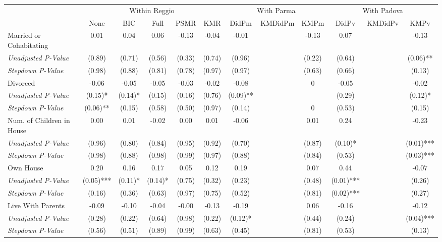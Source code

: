 \begin{tabular}{l c c c c c c c c c c c}
\toprule
& \multicolumn{5}{c}{Within Reggio} & \multicolumn{3}{c}{With Parma} & \multicolumn{3}{c}{With Padova} \\\cmidrule(lr){2-6} \cmidrule(lr){7-9} \cmidrule(lr){10-12}
 & None & BIC & Full & PSMR & KMR & DidPm & KMDidPm & KMPm & DidPv & KMDidPv & KMPv \\
\midrule
Married or Cohabitating & 0.01 & 0.04 & 0.06 & -0.13 & -0.04 & -0.01 & & -0.13 & 0.07 & & -0.13 \\
\quad \textit{Unadjusted P-Value} & (0.89) & (0.71) & (0.56) & (0.33) & (0.74) & (0.96) & & (0.22) & (0.64) & & (0.06)** \\
\quad \textit{Stepdown P-Value} & (0.98) & (0.88) & (0.81) & (0.78) & (0.97) & (0.97) & & (0.63) & (0.66) & & (0.13) \\
Divorced & -0.06 & -0.05 & -0.05 & -0.03 & -0.02 & -0.08 & & 0 & -0.05 & & -0.02 \\
\quad \textit{Unadjusted P-Value} & (0.15)* & (0.14)* & (0.15) & (0.16) & (0.76) & (0.09)** & & & (0.29) & & (0.12)* \\
\quad \textit{Stepdown P-Value} & (0.06)** & (0.15) & (0.58) & (0.50) & (0.97) & (0.14) & & 0 & (0.53) & & (0.15) \\
Num. of Children in House & 0.00 & 0.01 & -0.02 & 0.00 & 0.01 & -0.06 & & 0.01 & 0.24 & & -0.23 \\
\quad \textit{Unadjusted P-Value} & (0.96) & (0.80) & (0.84) & (0.95) & (0.92) & (0.70) & & (0.87) & (0.10)* & & (0.01)*** \\
\quad \textit{Stepdown P-Value} & (0.98) & (0.88) & (0.98) & (0.99) & (0.97) & (0.88) & & (0.84) & (0.53) & & (0.03)*** \\
Own House & 0.20 & 0.16 & 0.17 & 0.05 & 0.12 & 0.19 & & 0.07 & 0.44 & & -0.07 \\
\quad \textit{Unadjusted P-Value} & (0.05)*** & (0.11)* & (0.14)* & (0.75) & (0.32) & (0.23) & & (0.48) & (0.01)*** & & (0.26) \\
\quad \textit{Stepdown P-Value} & (0.16) & (0.36) & (0.63) & (0.97) & (0.75) & (0.52) & & (0.81) & (0.02)*** & & (0.27) \\
Live With Parents & -0.09 & -0.10 & -0.04 & -0.00 & -0.13 & -0.19 & & 0.06 & -0.16 & & -0.12 \\
\quad \textit{Unadjusted P-Value} & (0.28) & (0.22) & (0.64) & (0.98) & (0.22) & (0.12)* & & (0.44) & (0.24) & & (0.04)*** \\
\quad \textit{Stepdown P-Value} & (0.56) & (0.51) & (0.89) & (0.99) & (0.63) & (0.45) & & (0.81) & (0.53) & & (0.13) \\
\bottomrule
\end{tabular}
